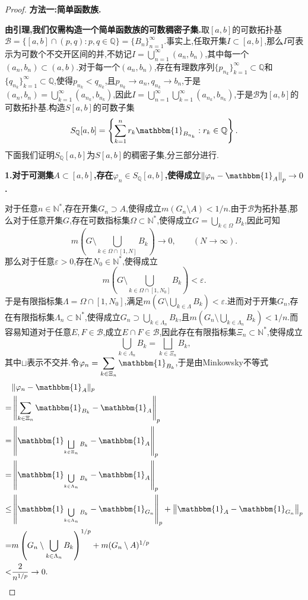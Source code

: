 \documentclass[lang = cn, scheme = chinese]{elegantbook}
\begin{document}
	\begin{proof}
		{\bf 方法一:简单函数族.}
		
		{\bf 由引理,我们仅需构造一个简单函数族的可数稠密子集.}取$[a,b]$的可数拓扑基$\mathscr{B}=\{ [a,b]\cap (p,q):p,q\in\mathbb{Q} \}=\{B_n\}_{n=1}^{\infty}$.事实上,任取开集$I\subset[a,b]$,那么$I$可表示为可数个不交开区间的并,不妨记$\displaystyle I=\bigcup_{n=1}^{\infty}(a_n,b_n)$,其中每一个$(a_n,b_n)\subset (a,b)$.对于每一个$(a_n,b_n)$,存在有理数序列$\{p_{n_k}\}_{k=1}^{\infty}\subset \mathbb{Q}$和$\{q_{n_k}\}_{k=1}^{\infty}\subset \mathbb{Q}$,使得$p_{n_k}<q_{n_k}$,且$p_{n_k}\to a_n,q_{n_k}\to b_n$,于是$\displaystyle (a_n,b_n)=\bigcup_{k=1}^{\infty}(a_{n_k},b_{n_k})$,因此$\displaystyle I=\bigcup_{n=1}^{\infty}\bigcup_{k=1}^{\infty}(a_{n_k},b_{n_k})$,于是$\mathscr{B}$为$[a,b]$的可数拓扑基.构造$S[a,b]$的可数子集
		$$
		S_{\mathbb{Q}}[a,b]=\left\{ \sum_{k=1}^{n}r_k\mathbbm{1}_{B_{n_k}}:r_k\in \mathbb{Q} \right\}.
		$$
		下面我们证明$S_{\mathbb{Q} }[a,b]$为$S[a,b]$的稠密子集,分三部分进行.
		
		{\bf 1.对于可测集$A\subset [a,b]$,存在$\varphi_n\in S_\mathbb{Q}[a,b]$,使得成立$\left\| \varphi_n-\mathbbm{1}_{A} \right\|_p\to0$.}
		
		对于任意$n\in\mathbb{N}^*$,存在开集$G_n\supset A$,使得成立$m(G_n\setminus A)<1/n$.由于$\mathscr{B}$为拓扑基,那么对于任意开集$G$,存在可数指标集$\Omega\subset \mathbb{N}^*$,使得成立$\displaystyle G=\bigcup_{k\in\Omega}B_k$,因此可知
		$$
		m\left(G\setminus \bigcup_{k\in\Omega\cap[1,N]}B_k\right)\to 0,\qquad (N\to\infty).
		$$
		那么对于任意$\varepsilon>0$,存在$N_0\in\mathbb{N}^*$,使得成立
		$$
		m\left(G\setminus \bigcup_{k\in\Omega\cap[1,N_0]}B_k\right)<\varepsilon.
		$$
		于是有限指标集$\Lambda=\Omega\cap[1,N_0]$,满足$m(G\setminus\bigcup_{k\in\Lambda}B_k)<\varepsilon$.进而对于开集$G_n$,存在有限指标集$\Lambda_n\subset\mathbb{N}^*$,使得成立$G_n\supset\bigcup_{k\in\Lambda_n}B_k$,且$m(G_n\setminus\bigcup_{k\in\Lambda_n}B_k)<1/n$.而容易知道对于任意$E,F\in\mathscr{B}$,成立$E\cap F\in\mathscr{B}$,因此存在有限指标集$\Xi_n\subset\mathbb{N}^*$,使得成立
		$$
		\bigcup_{k\in\Lambda_n}B_k=\bigsqcup_{k\in\Xi_n}B_k,
		$$
		其中$\sqcup$表示不交并.令$\displaystyle \varphi_n=\sum_{k\in\Xi_n}\mathbbm{1}_{B_k}$,于是由Minkowsky不等式
		\begin{align*}
			& \| \varphi_n-\mathbbm{1}_{A}\|_p\\
			= &\left\| \sum_{k\in\Xi_n}\mathbbm{1}_{B_k}-\mathbbm{1}_{A} \right\|_p\\
			= &\left\| \mathbbm{1}_{\bigsqcup\limits_{k\in\Xi_n}B_k}-\mathbbm{1}_{A} \right\|_p\\
			= &\left\| \mathbbm{1}_{\bigcup\limits_{k\in\Lambda_n}B_k}-\mathbbm{1}_{A} \right\|_p\\
			\le & \left\| \mathbbm{1}_{\bigcup\limits_{k\in\Lambda_n}B_k}-\mathbbm{1}_{G_n} \right\|_p+\left\| \mathbbm{1}_{A}-\mathbbm{1}_{G_n} \right\|_p\\
			=&m\left(G_n\setminus\bigcup_{k\in\Lambda_n}B_k\right)^{1/p}+m(G_n\setminus A)^{1/p}\\
			<&\frac{2}{n^{1/p}}\to0.
		\end{align*}
		

\end{proof}
\end{document}
